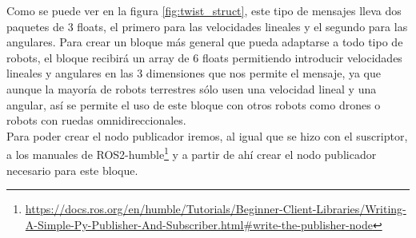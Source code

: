 Como se puede ver en la figura \ref{fig:twist_struct}, este tipo de mensajes lleva dos paquetes de 3 floats, el primero para las velocidades
lineales y el segundo para las angulares. Para crear un bloque más general que pueda adaptarse a todo tipo de robots, el bloque recibirá un array
de 6 floats permitiendo introducir velocidades lineales y angulares en las 3 dimensiones que nos permite el mensaje, ya que aunque la mayoría de
robots terrestres sólo usen una velocidad lineal y una angular, así se permite el uso de este bloque con otros robots como drones o robots con ruedas
omnidireccionales.\\

Para poder crear el nodo publicador iremos, al igual que se hizo con el suscriptor, a los manuales de
ROS2-humble\footnote{\url{https://docs.ros.org/en/humble/Tutorials/Beginner-Client-Libraries/Writing-A-Simple-Py-Publisher-And-Subscriber.html\#write-the-publisher-node}}
y a partir de ahí crear el nodo publicador necesario para este bloque.

